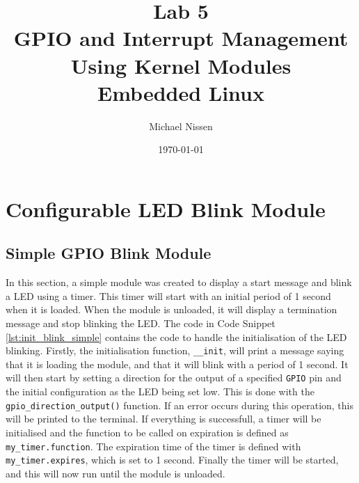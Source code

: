 \documentclass[a4paper,oneside,onecolumn]{article}
\newcommand{\code}[1]{\colorbox{codegray}{\texttt{#1}}}
\begin{document}
\title{Lab 5 \\ GPIO and Interrupt Management Using Kernel Modules \\ Embedded Linux}
\author{Michael Nissen}
\date{\today}
\maketitle
\bigskip

\section{Configurable LED Blink Module}

\subsection{Simple GPIO Blink Module}

In this section, a simple module was created to display a start message and blink a LED using a timer. This timer will start with an initial period of 1 second when it is loaded. When the module is unloaded, it will display a termination message and stop blinking the LED. The code in Code Snippet \ref{lst:init_blink_simple} contains the code to handle the initialisation of the LED blinking.
\newline
\newline
Firstly, the initialisation function, \code{\_\_init}, will print a message saying that it is loading the module, and that it will blink with a period of 1 second. It will then start by setting a direction for the output of a specified \texttt{GPIO} pin and the initial configuration as the LED being set low. This is done with the \code{gpio\_direction\_output()} function. If an error occurs during this operation, this will be printed to the terminal. If everything is successfull, a timer will be initialised and the function to be called on expiration is defined as \code{my\_timer.function}. The expiration time of the timer is defined with \code{my\_timer.expires}, which is set to 1 second. Finally the timer will be started, and this will now run until the module is unloaded.
\end{document}
